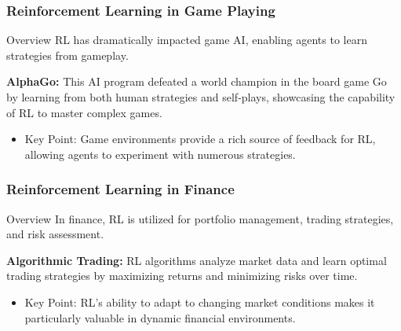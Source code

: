 \documentclass{beamer}
\begin{document}
\begin{frame}[fragile]
    \frametitle{Reinforcement Learning in Game Playing}
    \begin{block}{Overview}
        RL has dramatically impacted game AI, enabling agents to learn strategies from gameplay.
    \end{block}
    
    \begin{example}
        \textbf{AlphaGo:} This AI program defeated a world champion in the board game Go by learning from both human strategies and self-plays, showcasing the capability of RL to master complex games.
    \end{example}
    
    \begin{itemize}
        \item Key Point: Game environments provide a rich source of feedback for RL, allowing agents to experiment with numerous strategies.
    \end{itemize}
\end{frame}

\begin{frame}[fragile]
    \frametitle{Reinforcement Learning in Finance}
    \begin{block}{Overview}
        In finance, RL is utilized for portfolio management, trading strategies, and risk assessment.
    \end{block}
    
    \begin{example}
        \textbf{Algorithmic Trading:} RL algorithms analyze market data and learn optimal trading strategies by maximizing returns and minimizing risks over time.
    \end{example}
    
    \begin{itemize}
        \item Key Point: RL’s ability to adapt to changing market conditions makes it particularly valuable in dynamic financial environments.
    \end{itemize}
\end{frame}
\end{document}
